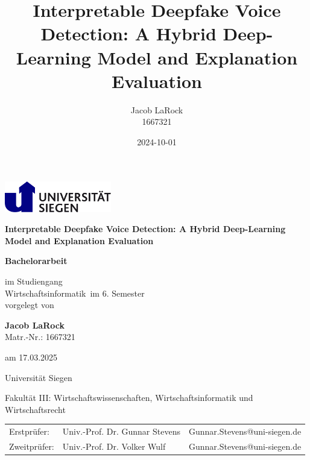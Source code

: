 \documentclass{article}
\title{Interpretable Deepfake Voice Detection: A Hybrid Deep-Learning Model and Explanation Evaluation}
\date{2024-10-01}
\author{Jacob LaRock\\1667321}
\makeatletter
\def\Institute{Universität Siegen}
\def\KindOfWork{Bachelorarbeit}
\def\Studiengang{Wirtschaftsinformatik}
\def\Fakultaet{Fakultät III: Wirtschaftswissenschaften, Wirtschaftsinformatik und Wirtschaftsrecht}
\def\Title{Interpretable Deepfake Voice Detection: A Hybrid Deep-Learning Model and Explanation Evaluation}
\def\Subtitle{}
\def\student{Jacob LaRock}
\def\studentno{1667321}
\def\Date{17.03.2025}
\def\semester{6}
\def\erstpruefer{Univ.-Prof. Dr. Gunnar Stevens}
\def\erstprueferMail{Gunnar.Stevens@uni-siegen.de}
\def\zweitpruefer{Univ.-Prof. Dr. Volker Wulf}
\def\zweitprueferMail{Gunnar.Stevens@uni-siegen.de}
\makeatother
\begin{document}
	\begin{titlepage}
        \begin{minipage}{0.9\linewidth}
			\centering
			\includegraphics [width=0.35\textwidth]{images/LogoSiegen}
        \end{minipage}

		\vspace{2cm}

		\centering

		{\Large\bfseries \Title\par}
		{\large\bfseries \Subtitle\par}
		\vspace{1.5cm}

		{\large \textbf{\KindOfWork}\par}

		\vspace{1cm}

		{\normalsize im Studiengang \\
			\Studiengang \ im \semester. Semester \\
		}
		\vspace{0.5cm}
		{\normalsize vorgelegt von}
		\vspace{0.5cm}

		{\normalsize \textbf{\student} \\
			Matr.-Nr.: \studentno  \\}
		{am \normalsize \Date\par}

		\vspace{0.5cm}

		{\Institute} \par
		{\Fakultaet}\par

		\vspace{0.5cm}

    {\begin{table}[ht]
			\centering\small
			\begin{tabular}{lll}
				{Erstprüfer:} & \erstpruefer & \erstprueferMail \\
				{Zweitprüfer:} & \zweitpruefer & \zweitprueferMail \\
			\end{tabular}
		\end{table}}     
		\vfill
	\end{titlepage}
    \newpage
\end{document}

